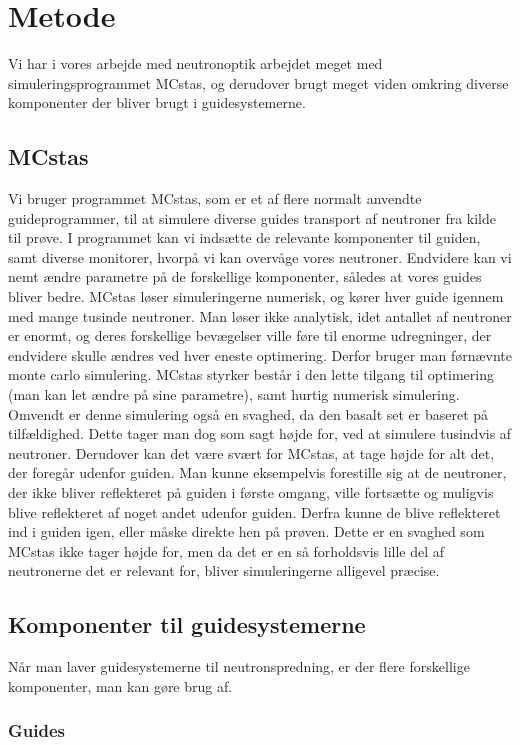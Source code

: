 \documentclass[12pt,oneside,a4paper]{article}
\begin{document}
{{{{{\section{Metode}
Vi har i vores arbejde med neutronoptik arbejdet meget med simuleringsprogrammet MCstas, og derudover brugt meget viden omkring diverse komponenter der bliver brugt i guidesystemerne.

\subsection{MCstas}
Vi bruger programmet MCstas, som er et af flere normalt anvendte guideprogrammer, til at simulere diverse guides transport af neutroner fra kilde til prøve. I programmet kan vi indsætte de relevante komponenter til guiden, samt diverse monitorer, hvorpå vi kan overvåge vores neutroner. Endvidere kan vi nemt ændre parametre på de forskellige komponenter, således at vores guides bliver bedre. MCstas løser simuleringerne numerisk, og kører hver guide igennem med mange tusinde neutroner. Man løser ikke analytisk, idet antallet af neutroner er enormt, og deres forskellige bevægelser ville føre til enorme udregninger, der endvidere skulle ændres ved hver eneste optimering. Derfor bruger man førnævnte monte carlo simulering. MCstas styrker består i den lette tilgang til optimering (man kan let ændre på sine parametre), samt hurtig numerisk simulering. Omvendt er denne simulering også en svaghed, da den basalt set er baseret på tilfældighed. Dette tager man dog som sagt højde for, ved at simulere tusindvis af neutroner. Derudover kan det være svært for MCstas, at tage højde for alt det, der foregår udenfor guiden. Man kunne eksempelvis forestille sig at de neutroner, der ikke bliver reflekteret på guiden i første omgang, ville fortsætte og muligvis blive reflekteret af noget andet udenfor guiden. Derfra kunne de blive reflekteret ind i guiden igen, eller måske direkte hen på prøven. Dette er en svaghed som MCstas ikke tager højde for, men da det er en så forholdsvis lille del af neutronerne det er relevant for, bliver simuleringerne alligevel præcise.


\subsection{Komponenter til guidesystemerne}
Når man laver guidesystemerne til neutronspredning, er der flere forskellige komponenter, man kan gøre brug af.

\subsubsection{Guides}

}}}}}
\end{document}
